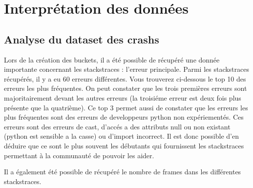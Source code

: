 \section{Interprétation des données}
\subsection{Analyse du dataset des crashs}
 Lors de la création des buckets, il a été possible de récupéré une donnée importante concernant les stackstraces : l'erreur principale. Parmi les stackstraces récupérés, il y a eu 60 erreurs différentes. Vous trouverez ci-dessous le top 10 des erreurs les plus fréquentes. On peut constater que les trois premières erreurs sont majoritairement devant les autres erreurs (la troisiéme erreur est deux fois plus présente que la quatrième). Ce top 3 permet aussi de constater que les erreurs les plus fréquentes sont des erreurs de developpeurs python non expériementés. Ces erreurs sont des erreurs de cast, d'accés a des attributs null ou non existant (python est sensible a la casse) ou d'import incorrect. Il est donc possible d'en déduire que ce sont le plus souvent les débutants qui fournissent les stackstraces permettant à la communauté de pouvoir les aider.

\begin{bchart}[step=10,max=110]
\end{bchart}

Il a également été possible de récupéré le nombre de frames dans les différentes stackstraces. 
 

